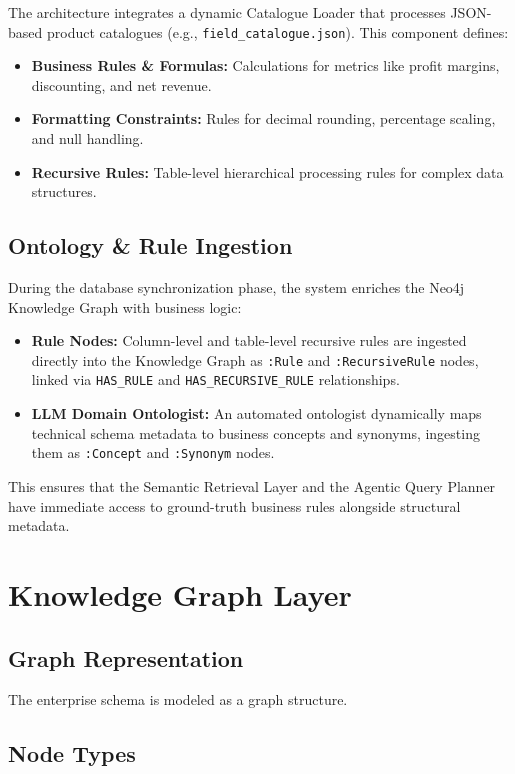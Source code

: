 \documentclass[11pt,a4paper]{article}
\begin{document}
The architecture integrates a dynamic Catalogue Loader that processes JSON-based product catalogues (e.g., \texttt{field\_catalogue.json}). This component defines:
\begin{itemize}
    \item \textbf{Business Rules \& Formulas:} Calculations for metrics like profit margins, discounting, and net revenue.
    \item \textbf{Formatting Constraints:} Rules for decimal rounding, percentage scaling, and null handling.
    \item \textbf{Recursive Rules:} Table-level hierarchical processing rules for complex data structures.
\end{itemize}

\subsection{Ontology \& Rule Ingestion}

During the database synchronization phase, the system enriches the Neo4j Knowledge Graph with business logic:
\begin{itemize}
    \item \textbf{Rule Nodes:} Column-level and table-level recursive rules are ingested directly into the Knowledge Graph as \texttt{:Rule} and \texttt{:RecursiveRule} nodes, linked via \texttt{HAS\_RULE} and \texttt{HAS\_RECURSIVE\_RULE} relationships.
    \item \textbf{LLM Domain Ontologist:} An automated ontologist dynamically maps technical schema metadata to business concepts and synonyms, ingesting them as \texttt{:Concept} and \texttt{:Synonym} nodes.
\end{itemize}
This ensures that the Semantic Retrieval Layer and the Agentic Query Planner have immediate access to ground-truth business rules alongside structural metadata.

\section{Knowledge Graph Layer}

\subsection{Graph Representation}

The enterprise schema is modeled as a graph structure.

\subsection{Node Types}
\end{document}

